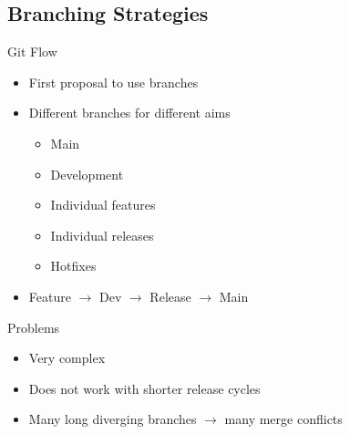 \subsection{Branching Strategies}
\begin{frame}{\insertsubsection{} }
	\begin{fancycolumns}[animation=none]
		\begin{definition}{Git Flow}
			\begin{itemize}
				\item First proposal to use branches
				\item Different branches for different aims
				      \begin{itemize}
					      \item Main
					      \item Development
					      \item Individual features
					      \item Individual releases
					      \item Hotfixes
				      \end{itemize}
				\item Feature $\rightarrow$ Dev $\rightarrow$ Release $\rightarrow$ Main
			\end{itemize}
		\end{definition}\pause
		\begin{note}{Problems}
			\begin{itemize}
				\item Very complex
				\item Does not work with shorter release cycles
				\item Many long diverging branches $\rightarrow$ many merge conflicts
			\end{itemize}
		\end{note}
		\nextcolumn
	\end{fancycolumns}
\end{frame}

